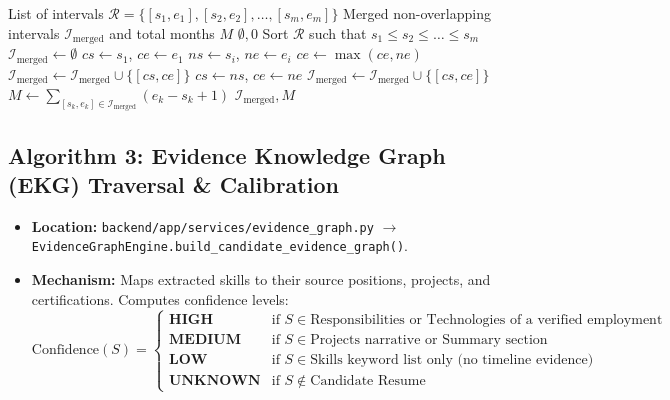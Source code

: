 \documentclass[11pt,a4paper]{report}
\begin{document}
\begin{algorithm}[H]
\caption{Interval-Union Merging for Non-Overlapping Career Tenure}
\label{alg:interval_union_pseudo}
\begin{algorithmic}[1]
\Require List of intervals $\mathcal{R} = \{[s_1, e_1], [s_2, e_2], \dots, [s_m, e_m]\}$
\Ensure Merged non-overlapping intervals $\mathcal{I}_{\text{merged}}$ and total months $M$
    \State \Return $\emptyset, 0$
\EndIf
\State Sort $\mathcal{R}$ such that $s_1 \le s_2 \le \dots \le s_m$
\State $\mathcal{I}_{\text{merged}} \gets \emptyset$
\State $cs \gets s_1$, $ce \gets e_1$
    \State $ns \gets s_i$, $ne \gets e_i$
     
        \State $ce \gets \max(ce, ne)$
    \Else
        \State $\mathcal{I}_{\text{merged}} \gets \mathcal{I}_{\text{merged}} \cup \{[cs, ce]\}$
        \State $cs \gets ns$, $ce \gets ne$
    \EndIf
\EndFor
\State $\mathcal{I}_{\text{merged}} \gets \mathcal{I}_{\text{merged}} \cup \{[cs, ce]\}$
\State $M \gets \sum_{[s_k, e_k] \in \mathcal{I}_{\text{merged}}} (e_k - s_k + 1)$
\State \Return $\mathcal{I}_{\text{merged}}, M$
\end{algorithmic}
\end{algorithm}

\subsection{Algorithm 3: Evidence Knowledge Graph (EKG) Traversal \& Calibration}
\begin{itemize}[leftmargin=1.5em]
    \item \textbf{Location:} \texttt{backend/app/services/evidence\_graph.py} $\to$ \texttt{EvidenceGraphEngine.build\_candidate\_evidence\_graph()}.
    \item \textbf{Mechanism:} Maps extracted skills to their source positions, projects, and certifications. Computes confidence levels:
    \begin{equation}
        \text{Confidence}(S) = \begin{cases}
            \textbf{HIGH} & \text{if } S \in \text{Responsibilities or Technologies of a verified employment entry} \\
            \textbf{MEDIUM} & \text{if } S \in \text{Projects narrative or Summary section} \\
            \textbf{LOW} & \text{if } S \in \text{Skills keyword list only (no timeline evidence)} \\
            \textbf{UNKNOWN} & \text{if } S \notin \text{Candidate Resume}
        \end{cases}
    \end{equation}
\end{itemize}
\end{document}
